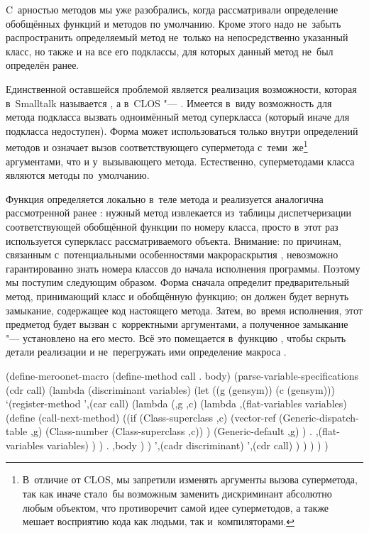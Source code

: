 C~арностью методов мы уже разобрались, когда рассматривали определение
обобщённых функций и методов по умолчанию. Кроме этого надо не~забыть
распространить определяемый метод не~только на непосредственно указанный класс,
но также и на все его подклассы, для которых данный метод не~был определён
ранее.

Единственной оставшейся проблемой является реализация возможности, которая
в~Smalltalk называется , а в~CLOS "--- . Имеется
в~виду возможность для метода подкласса вызвать одноимённый метод суперкласса
(который иначе для подкласса недоступен). Форма  может
использоваться только внутри определений методов и означает вызов
соответствующего суперметода с~теми~же\footnote{В~отличие от CLOS, мы запретили
изменять аргументы вызова суперметода, так как иначе стало~бы возможным заменить
дискриминант абсолютно любым объектом, что противоречит самой идее суперметодов,
а также мешает восприятию кода как людьми, так и~компиляторами.} аргументами,
что и у~вызывающего метода. Естественно, суперметодами класса 
являются методы по~умолчанию.

Функция  определяется локально в~теле метода и реализуется
аналогична рассмотренной ранее : нужный метод извлекается
из~таблицы диспетчеризации соответствующей обобщённой функции по номеру класса,
просто в~этот раз используется суперкласс рассматриваемого объекта. Внимание:
по причинам, связанным с~потенциальными особенностями макрораскрытия
, невозможно гарантированно знать
номера классов до начала исполнения программы. Поэтому мы поступим следующим
образом. Форма  сначала определит предварительный метод,
принимающий класс и обобщённую функцию; он должен будет вернуть замыкание,
содержащее код настоящего метода. Затем, во~время исполнения, этот предметод
будет вызван с~корректными аргументами, а полученное замыкание "--- установлено
на его место. Всё это помещается в~функцию , чтобы скрыть
детали реализации и не~перегружать ими определение макроса .

\begin{code:lisp}
(define-meroonet-macro (define-method call . body)
  (parse-variable-specifications
   (cdr call)
   (lambda (discriminant variables)
     (let ((g (gensym)) (c (gensym)))
       `(register-method
         ',(car call)
         (lambda (,g ,c)
           (lambda ,(flat-variables variables)
             (define (call-next-method)
               ((if (Class-superclass ,c)
                    (vector-ref (Generic-dispatch-table ,g)
                                (Class-number (Class-superclass ,c)) )
                    (Generic-default ,g) )
                . ,(flat-variables variables) ) )
             . ,body ) )
         ',(cadr discriminant)
         ',(cdr call) ) ) ) ) )
\end{code:lisp}

